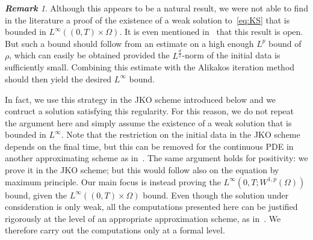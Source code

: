 \documentclass[a4paper,twosided, 11pt]{article}
\renewcommand{\color}[2][]{}
\theoremstyle{plain}
\theoremstyle{remark}
\newtheorem{remark}[thm]{\bf Remark}
\numberwithin{equation}{section}
\begin{document}
{\color{blue}
\begin{remark}
Although this appears to be a natural result, we were not able to find in the literature a proof of the existence of a weak solution to~\eqref{eq:KS} that is bounded in $L^{\infty}((0,T)\times\Omega)$. It is even mentioned in~\cite{MR2099126} that this result is open. But such a bound should follow from an estimate on a high enough $L^{p}$ bound of $\rho$, which can easily be obtained provided the $L^{\frac{d}{2}}$-norm of the initial data is sufficiently small. Combining this estimate with the Alikakos iteration method should then yield the desired $L^{\infty}$ bound.

In fact, we use this strategy in the JKO scheme introduced below and we contruct a solution satisfying this regularity. For this reason, we do not repeat the argument here and simply assume the existence of a weak solution that is bounded in $L^{\infty}$. Note that the restriction on the initial data in the JKO scheme depends on the final time, but this can be removed for the continuous PDE in another approximating scheme as in~\cite{SUGIYAMA2006333}. The same argument holds for positivity: we prove it in the JKO scheme; but this would follow also on the equation by maximum principle. Our main focus is instead proving the $L^{\infty}(0,T; W^{1,p}(\Omega))$ bound, given the $L^{\infty}((0,T)\times\Omega)$ bound.
Even though the solution under consideration is only weak, all the computations presented here can be justified rigorously at the level of an appropriate approximation scheme, as in~\cite{SUGIYAMA2006333}. We therefore carry out the computations only at a formal level.

\end{remark}
}
\end{document}
